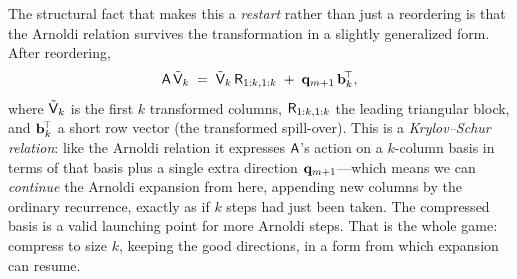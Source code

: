 The structural fact that makes this a \emph{restart} rather than just a reordering is that the
Arnoldi relation survives the transformation in a slightly generalized form. After reordering,
\[
  \mathsf{A}\,\tilde{\mathsf{V}}_k
    \;=\; \tilde{\mathsf{V}}_k\,\mathsf{R}_{1:k,1:k}
       \;+\; \mathbf{q}_{m+1}\,\mathbf{b}_k^{\!\top},
\]
where $\tilde{\mathsf{V}}_k$ is the first $k$ transformed columns, $\mathsf{R}_{1:k,1:k}$ the leading
triangular block, and $\mathbf{b}_k^{\!\top}$ a short row vector (the transformed spill-over). This is a
\emph{Krylov--Schur relation}: like the Arnoldi relation it expresses $\mathsf{A}$'s action on a
$k$-column basis in terms of that basis plus a single extra direction $\mathbf{q}_{m+1}$---which means
we can \emph{continue} the Arnoldi expansion from here, appending new columns by the ordinary
recurrence, exactly as if $k$ steps had just been taken. The compressed basis is a valid
launching point for more Arnoldi steps. That is the whole game: compress to size $k$, keeping the
good directions, in a form from which expansion can resume.

